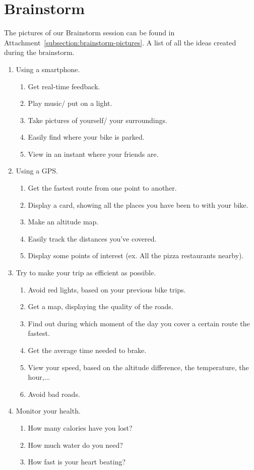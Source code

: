 \section{Brainstorm}
The pictures of our Brainstorm session can be found in Attachment~\ref{subsection:brainstorm-pictures}.
A list of all the ideas created during the brainstorm.
\begin{enumerate}
 \item Using a smartphone.
  \begin{enumerate}
   \item Get real-time feedback.
   \item Play music/ put on a light.
   \item Take pictures of yourself/ your surroundings.
   \item Easily find where your bike is parked.
   \item View in an instant where your friends are.
  \end{enumerate}
 \item Using a GPS.
  \begin{enumerate}
   \item Get the fastest route from one point to another.
   \item Display a card, showing all the places you have been to with your bike. 
   \item Make an altitude map.
   \item Easily track the distances you've covered.
   \item Display some points of interest (ex. All the pizza restaurants nearby).
  \end{enumerate}
 \item Try to make your trip as efficient as possible.
  \begin{enumerate}
   \item Avoid red lights, based on your previous bike trips.
   \item Get a map, displaying the quality of the roads.
   \item Find out during which moment of the day you cover a certain route the fastest.
   \item Get the average time needed to brake.
   \item View your speed, based on the altitude difference, the temperature, the hour,...
   \item Avoid bad roads.
  \end{enumerate}
 \item Monitor your health.
  \begin{enumerate}
   \item How many calories have you lost?
   \item How much water do you need?
   \item How fast is your heart beating?
  \end{enumerate}
\end{enumerate}



